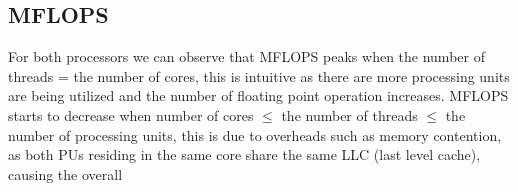 \documentclass[a4paper]{article}
\begin{document}
\subsection*{MFLOPS}
\begin{minipage}{0.5\linewidth}
    \noindent{}
\end{minipage}\hfill
\begin{minipage}{0.4\linewidth}
For both processors we can observe that MFLOPS peaks when the number of threads
= the number of cores, this is intuitive as there are more processing units are being utilized and the number of floating 
point operation increases. MFLOPS starts to decrease when number of cores $\leq$ the number of threads $\leq$ 
the number of processing units, this is due to overheads such as memory contention, as both PUs residing in the 
same core share the same LLC (last level cache), causing the overall 
\end{minipage}\hfill
\end{document}
